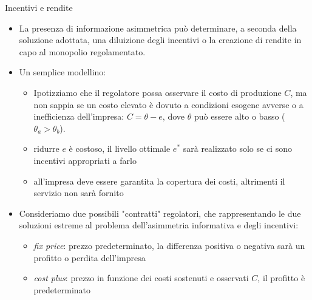 \documentclass[aspectratio=149,11pt]{beamer}
\begin{document}
\begin{frame}{Incentivi e rendite}
\begin{itemize}
\item La presenza di informazione asimmetrica può determinare, a seconda della
soluzione adottata, una \alert{diluizione degli incentivi} o la creazione di
\alert{rendite} in capo al monopolio regolamentato.
\item Un semplice modellino:
\begin{itemize}
\item Ipotizziamo che il regolatore possa osservare il costo di produzione $C$, ma
non sappia se un costo elevato è dovuto a condizioni esogene avverse o a
inefficienza dell'impresa: $C=\theta-e$, dove $\theta$ può essere alto
o basso ($\theta_a>\theta_b$).
\item ridurre $e$ è costoso, il livello ottimale $e^*$ sarà realizzato solo se
ci sono incentivi appropriati a farlo
\item all'impresa deve essere garantita la copertura dei costi, altrimenti il
servizio non sarà fornito
\end{itemize}
\item Consideriamo due possibili "contratti" regolatori, che rappresentando le due
soluzioni estreme al problema dell'asimmetria informativa e degli incentivi:
\begin{itemize}
\item \emph{fix price}: prezzo predeterminato, la differenza positiva o negativa sarà
un profitto o perdita dell'impresa
\item \emph{cost plus}: prezzo in funzione dei costi sostenuti e osservati $C$, il
profitto è predeterminato
\end{itemize}
\end{itemize}
\end{frame}
\end{document}

